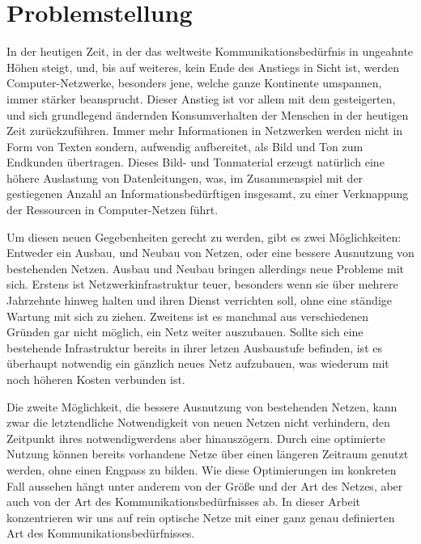 \section{Problemstellung}
In der heutigen Zeit, in der das weltweite Kommunikationsbedürfnis in ungeahnte Höhen steigt, und, bis auf weiteres, kein Ende des Anstiegs in Sicht ist, werden
Computer-Netzwerke, besonders jene, welche ganze Kontinente umspannen, immer stärker beansprucht. Dieser Anstieg ist vor allem mit dem gesteigerten, und sich
grundlegend ändernden Konsumverhalten der Menschen in der heutigen Zeit zurückzuführen. Immer mehr Informationen in Netzwerken werden nicht in Form von Texten
sondern, aufwendig aufbereitet, als Bild und Ton zum Endkunden übertragen. Dieses Bild- und Tonmaterial erzeugt natürlich eine höhere Auslastung von Datenleitungen,
was, im Zusammenspiel mit der gestiegenen Anzahl an Informationsbedürftigen insgesamt, zu einer Verknappung der Ressourcen in Computer-Netzen führt.

Um diesen neuen Gegebenheiten gerecht zu werden, gibt es zwei Möglichkeiten: Entweder ein Ausbau, und Neubau von Netzen, oder eine bessere Ausnutzung von bestehenden
Netzen. Ausbau und Neubau bringen allerdings neue Probleme mit sich. Erstens ist Netzwerkinfrastruktur teuer, besonders wenn sie über mehrere Jahrzehnte hinweg
halten und ihren Dienst verrichten soll, ohne eine ständige Wartung mit sich zu ziehen. Zweitens ist es manchmal aus verschiedenen Gründen gar nicht möglich, 
ein Netz weiter auszubauen. Sollte sich eine bestehende Infrastruktur bereits in ihrer letzen Ausbaustufe befinden, ist es überhaupt notwendig ein gänzlich
neues Netz aufzubauen, was wiederum mit noch höheren Kosten verbunden ist.

Die zweite Möglichkeit, die bessere Ausnutzung von bestehenden Netzen, kann zwar die letztendliche Notwendigkeit von neuen Netzen nicht verhindern, den Zeitpunkt
ihres notwendigwerdens aber hinauszögern. Durch eine optimierte Nutzung können bereits vorhandene Netze über einen längeren Zeitraum genutzt werden, ohne einen
Engpass zu bilden. Wie diese Optimierungen im konkreten Fall aussehen hängt unter anderem von der Größe und der Art des Netzes, aber auch von der Art des
Kommunikationsbedürfnisses ab. In dieser Arbeit konzentrieren wir uns auf rein optische Netze mit einer ganz genau definierten Art des Kommunikationsbedürfnisses.


